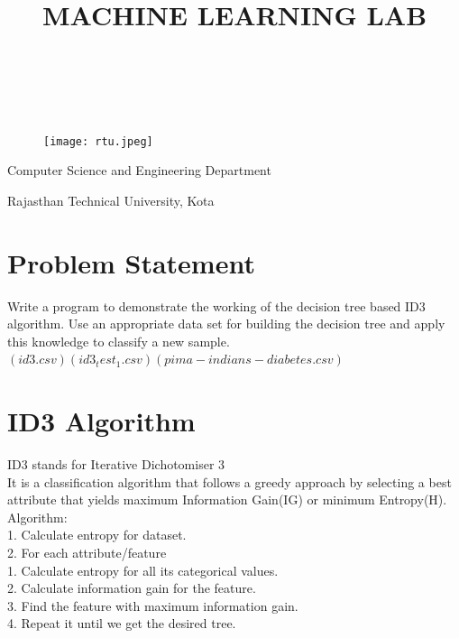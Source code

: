 \documentclass[a4paper]{article}
\begin{document}
	\title{\textbf{MACHINE LEARNING LAB}}
	\author{}
	\maketitle
	\\
	\\
	\begin{figure}[h]
		\centering
		\texttt{[image: rtu.jpeg]}
	\end{figure}

	\begin{large}
		Computer Science and Engineering Department\\
	\end{large}
	\begin{Large}Rajasthan Technical University, Kota\\
	\end{Large}
\newpage
	\flushleft
	\tableofcontents
	\newpage
	\section{Problem Statement}
		Write a program to demonstrate the working of the decision tree based ID3 algorithm. Use an appropriate
    data set for building the decision tree and apply this knowledge to classify a new sample.
   \begin{math} (id3.csv) (id3_test_1.csv) (pima-indians-diabetes.csv)\end{math}
\newpage
	\section{ID3 Algorithm}
	ID3 stands for Iterative Dichotomiser 3\\
    It is a classification algorithm that follows a greedy approach by selecting a best attribute that yields maximum Information Gain(IG) or minimum Entropy(H).
    \newline
    Algorithm:\\
	1. Calculate entropy for dataset.\\
    2. For each attribute/feature\\
	\hspace{10mm}1. Calculate entropy for all its categorical values.\\
	\hspace{10mm}2. Calculate information gain for the feature.\\
	3. Find the feature with maximum information gain.\\
	4. Repeat it until we get the desired tree.
	
\end{document}
